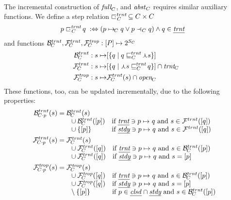 \documentclass{article}
\begin{document}
%
The incremental construction of $\Full[C]$, and $\Absent[C]$ requires similar auxiliary functions. We define a step relation ${\transientstep[C]}\subseteq C\times C$
%
\begin{align*}
p \transientstep[C] q \;\iffdef\; & (p\stepany[C] q \vee p\gostep[C] q) \wedge q\in\pTransient
\end{align*}
%
and functions $\BackTrans[C],\ForwTrans[C],\ForwTrOp[C]:[P]\mapsto 2^{S_C}$
%
\begin{align*}
\BackTrans[C] : s\mapsto & \stat{\gensetof{q}{q\transienttoeq[C] \prm s}} \\
\ForwTrans[C] : s\mapsto & \stat{\gensetof{q}{\prm s\transienttoeq[C] q}}\cap \Transient[C] \\
\ForwTrOp[C] : s\mapsto & \ForwTrans[C](s) \cap \Open[C]
\end{align*}
%
These functions, too, can be updated incrementally, due to the following properties:
%
\begin{align*}
\BackTrans[\addp Cp](s) = {}
 & \begin{array}[t]{@{}ll}
 	\BackTrans[C](s) \\
 	{\enspace} \cup \BackTrans[C]([p]) & \text{if } \pTransient\ni p\stepany q \text{ and } s\in \ForwTrans([q]) \\
 	{\enspace} \cup \setof{[p]} & \text{if } \pSteady\ni p\stepany q \text{ and } s\in \ForwTrans([q])
 \end{array} \\
\ForwTrans[\addp Cp](s) = {}
 & \begin{array}[t]{@{}ll}
   \ForwTrans[C](s) \\
   {\enspace} \cup \ForwTrans[C]([q]) & \text{if } \pTransient\ni p\stepany q \text{ and } s\in \BackTrans[C](\stat p) \\
   {\enspace} \cup \ForwTrans[C]([q]) & \text{if } \pSteady\ni p\stepany q \text{ and } s=[p] 
   \end{array} \\
\ForwTrOp[\addp Cp](s) = {}
& \begin{array}[t]{@{}ll}
	\ForwTrOp[C](s) \\
	{\enspace} \cup \ForwTrOp[C]([q]) & \text{if } \pTransient\ni p\stepany q \text{ and } s\in \BackTrans[C](\stat p) \\
	{\enspace} \cup \ForwTrOp[C]([q]) & \text{if } \pSteady\ni p\stepany q \text{ and } s=[p] \\
	{\enspace} \setminus \setof{\stat p} & \text{if } p\in \pClosed \cap \pSteady \text{ and } s\in \BackTrans[C](\stat p)
\end{array} 
\end{align*}
\end{document}
